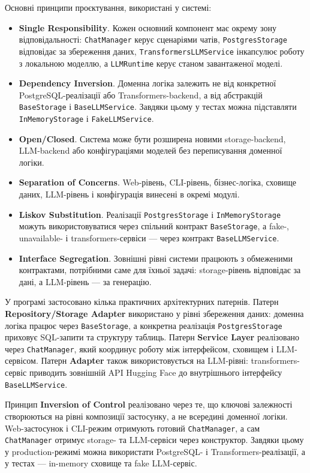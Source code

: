 Основні принципи проєктування, використані у системі:
\begin{itemize}
  \item \textbf{Single Responsibility}. Кожен основний компонент має окрему зону відповідальності: \texttt{ChatManager} керує сценаріями чатів, \texttt{PostgresStorage} відповідає за збереження даних, \texttt{TransformersLLMService} інкапсулює роботу з локальною моделлю, а \texttt{LLMRuntime} керує станом завантаженої моделі.
  \item \textbf{Dependency Inversion}. Доменна логіка залежить не від конкретної PostgreSQL-реалізації або Transformers-backend, а від абстракцій \texttt{BaseStorage} і \texttt{BaseLLMService}. Завдяки цьому у тестах можна підставляти \texttt{InMemoryStorage} і \texttt{FakeLLMService}.
  \item \textbf{Open/Closed}. Система може бути розширена новими storage-backend, LLM-backend або конфігураціями моделей без переписування доменної логіки.
  \item \textbf{Separation of Concerns}. Web-рівень, CLI-рівень, бізнес-логіка, сховище даних, LLM-рівень і конфігурація винесені в окремі модулі.
  \item \textbf{Liskov Substitution}. Реалізації \texttt{PostgresStorage} і \texttt{InMemoryStorage} можуть використовуватися через спільний контракт \texttt{BaseStorage}, а fake-, unavailable- і transformers-сервіси --- через контракт \texttt{BaseLLMService}.
  \item \textbf{Interface Segregation}. Зовнішні рівні системи працюють з обмеженими контрактами, потрібними саме для їхньої задачі: storage-рівень відповідає за дані, а LLM-рівень --- за генерацію.
\end{itemize}

У програмі застосовано кілька практичних архітектурних патернів. Патерн \textbf{Repository/Storage Adapter} використано у рівні збереження даних: доменна логіка працює через \texttt{BaseStorage}, а конкретна реалізація \texttt{PostgresStorage} приховує SQL-запити та структуру таблиць. Патерн \textbf{Service Layer} реалізовано через \texttt{ChatManager}, який координує роботу між інтерфейсом, сховищем і LLM-сервісом. Патерн \textbf{Adapter} також використовується на LLM-рівні: transformers-сервіс приводить зовнішній API Hugging Face до внутрішнього інтерфейсу \texttt{BaseLLMService}.

Принцип \textbf{Inversion of Control} реалізовано через те, що ключові залежності створюються на рівні композиції застосунку, а не всередині доменної логіки. Web-застосунок і CLI-режим отримують готовий \texttt{ChatManager}, а сам \texttt{ChatManager} отримує storage- та LLM-сервіси через конструктор. Завдяки цьому у production-режимі можна використати PostgreSQL- і Transformers-реалізації, а у тестах --- in-memory сховище та fake LLM-сервіс.

